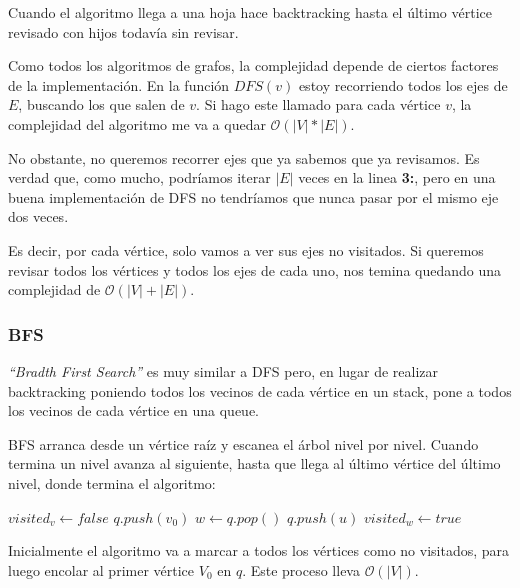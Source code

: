 Cuando el algoritmo llega a una hoja hace backtracking hasta el \'ultimo v\'ertice revisado con hijos todav\'ia sin revisar.

Como todos los algoritmos de grafos, la complejidad depende de ciertos factores de la implementaci\'on. En la funci\'on $DFS(v)$ estoy recorriendo todos los ejes de $E$, buscando los que salen de $v$. Si hago este llamado para cada v\'ertice $v$, la complejidad del algoritmo me va a quedar $\mathcal{O}(|V| * |E|)$.

No obstante, no queremos recorrer ejes que ya sabemos que ya revisamos. Es verdad que, como mucho, podr\'iamos iterar $|E|$ veces en la linea \textbf{3:}, pero en una buena implementaci\'on de DFS no tendr\'iamos que nunca pasar por el mismo eje dos veces.

Es decir, por cada v\'ertice, solo vamos a ver sus ejes no visitados. Si queremos revisar todos los v\'ertices y todos los ejes de cada uno, nos temina quedando una complejidad de $\mathcal{O}(|V| + |E|)$.

\newpage
\subsubsection{BFS}

\emph{``Bradth First Search''} es muy similar a DFS pero, en lugar de realizar backtracking poniendo todos los vecinos de cada v\'ertice en un stack, pone a todos los vecinos de cada v\'ertice en una queue.

BFS arranca desde un v\'ertice ra\'iz y escanea el \'arbol nivel por nivel. Cuando termina un nivel avanza al siguiente, hasta que llega al \'ultimo v\'ertice del \'ultimo nivel, donde termina el algoritmo:

\begin{algorithm}
\begin{algorithmic}[1]
    \State $visited_v \gets false$
  \EndFor
  \State $q.push(v_0)$
    \State $w \gets q.pop()$
          \State $q.push(u)$
        \EndIf
      \EndFor
      \State $visited_w \gets true$
    \EndIf
  \EndWhile
\EndFunction
\end{algorithmic}
\end{algorithm}

Inicialmente el algoritmo va a marcar a todos los v\'ertices como no visitados, para luego encolar al primer v\'ertice $V_0$ en $q$. Este proceso lleva $\mathcal{O}(|V|)$.

